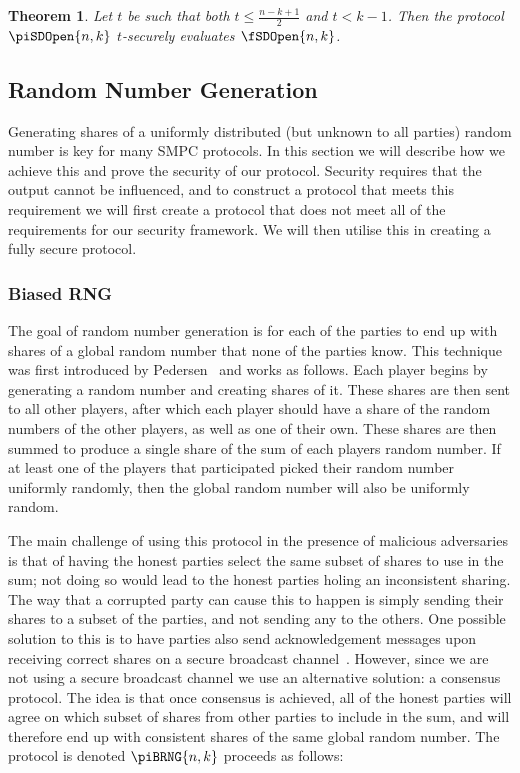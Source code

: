 \documentclass{article}
\newtheorem{theorem}{Theorem}
\theoremstyle{remark}
\begin{document}
\begin{theorem}
	Let $t$ be such that both $t \le \frac{n - k + 1}{2}$ and $t < k - 1$. Then
	the protocol $\piSDOpen{n,k}$ $t$-securely evaluates $\fSDOpen{n,k}$.
\end{theorem}

\subsection{Random Number Generation}\label{sec:rng}

Generating shares of a uniformly distributed (but unknown to all parties)
random number is key for many SMPC protocols. In this section we will describe
how we achieve this and prove the security of our protocol. Security requires
that the output cannot be influenced, and to construct a protocol that meets
this requirement we will first create a protocol that does not meet all of the
requirements for our security framework. We will then utilise this in creating
a fully secure protocol.

\subsubsection{Biased RNG}

The goal of random number generation is for each of the parties to end up with
shares of a global random number that none of the parties know. This technique
was first introduced by Pedersen~\cite{p91a} and works as follows. Each player
begins by generating a random number and creating shares of it. These shares
are then sent to all other players, after which each player should have a share
of the random numbers of the other players, as well as one of their own.  These
shares are then summed to produce a single share of the sum of each players
random number. If at least one of the players that participated picked their
random number uniformly randomly, then the global random number will also be
uniformly random.

The main challenge of using this protocol in the presence of malicious
adversaries is that of having the honest parties select the same subset of
shares to use in the sum; not doing so would lead to the honest parties holing
an inconsistent sharing. The way that a corrupted party can cause this to
happen is simply sending their shares to a subset of the parties, and not
sending any to the others. One possible solution to this is to have parties
also send acknowledgement messages upon receiving correct shares on a secure
broadcast channel~\cite{gjkr96}. However, since we are not using a secure
broadcast channel we use an alternative solution: a consensus protocol. The
idea is that once consensus is achieved, all of the honest parties will agree
on which subset of shares from other parties to include in the sum, and will
therefore end up with consistent shares of the same global random number. The
protocol is denoted $\piBRNG{n,k}$ proceeds as follows:
\end{document}
